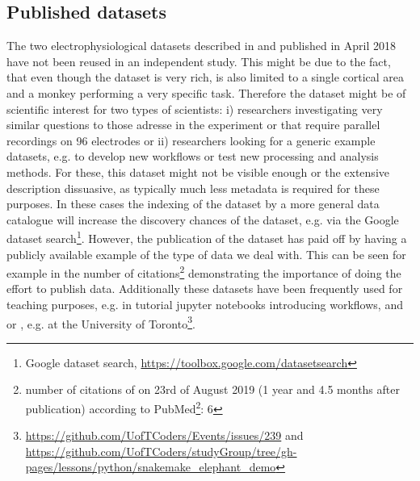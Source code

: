\subsection{Published datasets}
The two electrophysiological datasets described in \citep{Brochier_2018} and published in April 2018 have not been reused in an independent study. This might be due to the fact, that even though the dataset is very rich, is also limited to a single cortical area and a monkey performing a very specific task. Therefore the dataset might be of scientific interest for two types of scientists: i) researchers investigating very similar questions to those adresse in the experiment or that require parallel recordings on 96 electrodes or ii) researchers looking for a generic example datasets, e.g. to develop new workflows or test new processing and analysis methods. For these, this dataset might not be visible enough or the extensive description dissuasive, as typically much less metadata is required for these purposes. In these cases the indexing of the dataset by a more general data catalogue will increase the discovery chances of the dataset, e.g. via the Google dataset search\footnote{Google dataset search, \url{https://toolbox.google.com/datasetsearch}}.
However, the publication of the dataset has paid off by having a publicly available example of the type of data we deal with. This can be seen for example in the number of citations\footnote{number of citations of \citep{Brochier_2018} on 23rd of August 2019 (1 year and 4.5 months after publication) according to PubMed\footnote{\url{https://www.ncbi.nlm.nih.gov/pubmed?linkname=pubmed_pubmed_citedin&from_uid=29633986}}: 6} demonstrating the importance of doing the effort to publish data. Additionally these datasets have been frequently used for teaching purposes, e.g. in tutorial jupyter notebooks introducing  workflows,  and or , e.g. at the University of Toronto\footnote{\url{https://github.com/UofTCoders/Events/issues/239} and \url{https://github.com/UofTCoders/studyGroup/tree/gh-pages/lessons/python/snakemake_elephant_demo}}.

